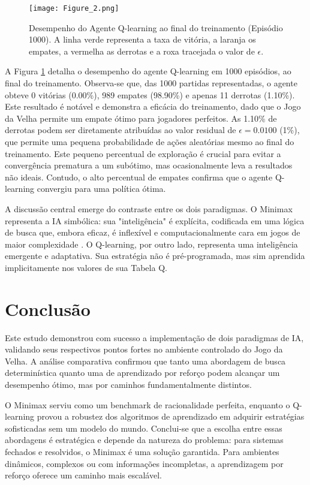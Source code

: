 \documentclass[conference]{IEEEtran}
\begin{document}
\begin{figure}[H]
\centering
\texttt{[image: Figure\_2.png]}
\caption{Desempenho do Agente Q-learning ao final do treinamento (Episódio 1000). A linha verde representa a taxa de vitória, a laranja os empates, a vermelha as derrotas e a roxa tracejada o valor de $\epsilon$.}
\label{fig:q_learning_final_performance}
\end{figure}

A Figura \ref{fig:q_learning_final_performance} detalha o desempenho do agente Q-learning em 1000 episódios, ao final do treinamento. Observa-se que, das 1000 partidas representadas, o agente obteve 0 vitórias (0.00\%), 989 empates (98.90\%) e apenas 11 derrotas (1.10\%). Este resultado é notável e demonstra a eficácia do treinamento, dado que o Jogo da Velha permite um empate ótimo para jogadores perfeitos. As 1.10\% de derrotas podem ser diretamente atribuídas ao valor residual de $\epsilon = 0.0100$ (1\%), que permite uma pequena probabilidade de ações aleatórias mesmo ao final do treinamento. Este pequeno percentual de exploração é crucial para evitar a convergência prematura a um subótimo, mas ocasionalmente leva a resultados não ideais. Contudo, o alto percentual de empates confirma que o agente Q-learning convergiu para uma política ótima.

A discussão central emerge do contraste entre os dois paradigmas. O Minimax representa a IA simbólica: sua "inteligência" é explícita, codificada em uma lógica de busca que, embora eficaz, é inflexível e computacionalmente cara em jogos de maior complexidade \cite{lermen2021}. O Q-learning, por outro lado, representa uma inteligência emergente e adaptativa. Sua estratégia não é pré-programada, mas sim aprendida implicitamente nos valores de sua Tabela Q.

\section{Conclusão}
Este estudo demonstrou com sucesso a implementação de dois paradigmas de IA, validando seus respectivos pontos fortes no ambiente controlado do Jogo da Velha. A análise comparativa confirmou que tanto uma abordagem de busca determinística quanto uma de aprendizado por reforço podem alcançar um desempenho ótimo, mas por caminhos fundamentalmente distintos.

O Minimax serviu como um benchmark de racionalidade perfeita, enquanto o Q-learning provou a robustez dos algoritmos de aprendizado em adquirir estratégias sofisticadas sem um modelo do mundo. Conclui-se que a escolha entre essas abordagens é estratégica e depende da natureza do problema: para sistemas fechados e resolvidos, o Minimax é uma solução garantida. Para ambientes dinâmicos, complexos ou com informações incompletas, a aprendizagem por reforço oferece um caminho mais escalável.
\end{document}
